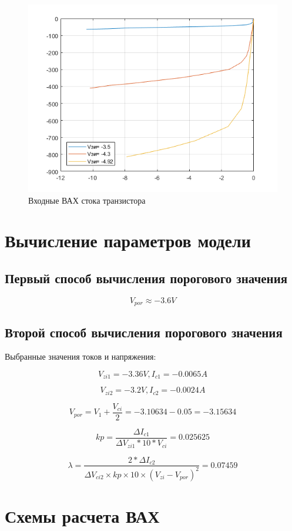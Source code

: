 \documentclass[a4paper,14pt]{article}
\begin{document}
\begin{figure}[H]
	\centering
	\includegraphics[width=0.7\linewidth]{image/graph_2}
	\caption{Входные ВАХ стока транзистора}
	\label{fig:graph2}
\end{figure}

\section{Вычисление параметров модели}

\subsection{Первый способ вычисления порогового значения}

$$V_{por} \approx -3.6V$$


\subsection{Второй способ вычисления порогового значения}

Выбранные значения токов и напряжения:

$$V_{zi1} = -3.36V,	I_{c1} = -0.0065A$$

$$V_{zi2} = -3.2V,	I_{c2} = -0.0024A$$

$$V_{por} = V_1 + \frac{V_{ci}}{2} = -3.10634 - 0.05 = -3.15634$$

$$kp = \frac{\Delta I_{c1}}{\Delta V_{zi1} * 10 * V_{ci}} = 0.025625$$

$$\lambda = \frac{2*\Delta I_{c2}}{\Delta V_{ci2} \times kp \times 10 \times (V_{zi} - V_{por})^2} = 0.07459$$ 

\section{Схемы расчета ВАХ}
\end{document}

